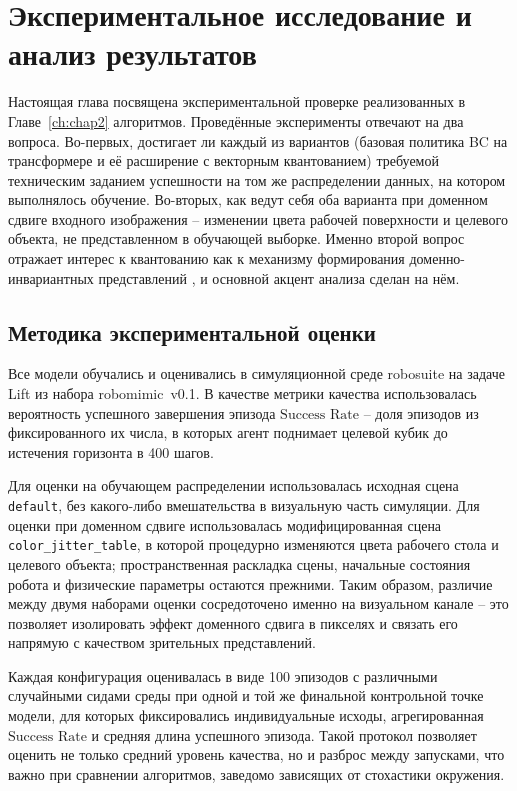 \chapter{Экспериментальное исследование и анализ результатов}
\label{ch:chap3}

Настоящая глава посвящена экспериментальной проверке реализованных в Главе~\ref{ch:chap2} алгоритмов. Проведённые эксперименты отвечают на два вопроса. Во-первых, достигает ли каждый из вариантов (базовая политика BC на трансформере и её расширение с векторным квантованием) требуемой техническим заданием успешности на том же распределении данных, на котором выполнялось обучение. Во-вторых, как ведут себя оба варианта при доменном сдвиге входного изображения -- изменении цвета рабочей поверхности и целевого объекта, не представленном в обучающей выборке. Именно второй вопрос отражает интерес к квантованию как к механизму формирования доменно-инвариантных представлений \cite{yang2023vector}, и основной акцент анализа сделан на нём.

\section{Методика экспериментальной оценки}
\label{sec:eval-protocol}

Все модели обучались и оценивались в симуляционной среде robosuite на задаче Lift из набора robomimic~v0.1. В качестве метрики качества использовалась вероятность успешного завершения эпизода $\text{Success Rate}$ -- доля эпизодов из фиксированного их числа, в которых агент поднимает целевой кубик до истечения горизонта в 400 шагов.

Для оценки на обучающем распределении использовалась исходная сцена \texttt{default}, без какого-либо вмешательства в визуальную часть симуляции. Для оценки при доменном сдвиге использовалась модифицированная сцена \texttt{color\_jitter\_table}, в которой процедурно изменяются цвета рабочего стола и целевого объекта; пространственная раскладка сцены, начальные состояния робота и физические параметры остаются прежними. Таким образом, различие между двумя наборами оценки сосредоточено именно на визуальном канале -- это позволяет изолировать эффект доменного сдвига в пикселях и связать его напрямую с качеством зрительных представлений.

Каждая конфигурация оценивалась в виде 100 эпизодов с различными случайными сидами среды при одной и той же финальной контрольной точке модели, для которых фиксировались индивидуальные исходы, агрегированная $\text{Success Rate}$ и средняя длина успешного эпизода. Такой протокол позволяет оценить не только средний уровень качества, но и разброс между запусками, что важно при сравнении алгоритмов, заведомо зависящих от стохастики окружения.

